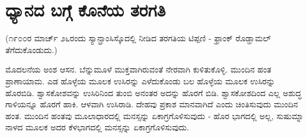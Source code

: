 
\chapter{ಧ್ಯಾನದ ಬಗ್ಗೆ ಕೊನೆಯ ತರಗತಿ}

(೧೯೦೦ರ ಮಾರ್ಚ್ ೨೬ರಂದು ಸ್ಯಾನ್ಫ್ರಾಂಸಿಸ್ಕೊದಲ್ಲಿ ನೀಡಿದ ತರಗತಿಯ ಟಿಪ್ಪಣಿ - ಫ್ರಾಂಕ್ ರೊಡ್ಹಾಮಲ್ ತೆಗೆದುಕೊಂಡುದು.)

ಮೊದಲನೆಯ ಅಂಶ ಆಸನ. ಬೆನ್ನುಮೂಳೆ ಮುಕ್ತವಾಗಿರುವಂತೆ ನೇರವಾಗಿ ಕುಳಿತುಕೊಳ್ಳಿ. ಮುಂದಿನ ಹಂತ ಪ್ರಾಣಾಯಾಮ. ಎಡ ಹೊಳ್ಳೆಯ ಮೂಲಕ ಉಸಿರನ್ನು ಎಳೆದುಕೊಂಡು ಬಲ ಹೊಳ್ಳೆಯ ಮೂಲಕ ಉಸಿರನ್ನು ಹೊರಬಿಡಿ. ಶ್ವಾಸಕೋಶವನ್ನು ಉಸಿರಿನಿಂದ ತುಂಬಿ ಅನಂತರ ಅದನ್ನು ಹೊರಗೆ ಬಿಡಿ. ಶ್ವಾಸಕೋಶದಿಂದ ಎಲ್ಲ ಅಶುದ್ಧ ಗಾಳಿಯನ್ನೂ ಹೊರಗೆ ಹಾಕಿ. ಆಳವಾಗಿ ಉಸಿರಾಡಿ. ದೇಹವು ಪ್ರಕಾಶ ಮಾನವಾಗಿದೆ ಎಂದು ಚಿಂತಿಸುವುದು ಮುಂದಿನ ಹಂತ. ಮುಂದಿನ ಹಂತವು ಮೂಲಾಧಾರದಲ್ಲಿ ಮನಸ್ಸನ್ನು ಏಕಾಗ್ರಗೊಳಿಸುವುದು - ಹೊರ ಭಾಗದಲ್ಲಿ ಅಲ್ಲ, ಸುಷುಮ್ನಾ ನಾಳದ ಮೂಲಕ ಅದರ ಕೆಳಭಾಗದಲ್ಲಿ ಮನಸ್ಸನ್ನು ಏಕಾಗ್ರಗೊಳಿಸುವುದು.

